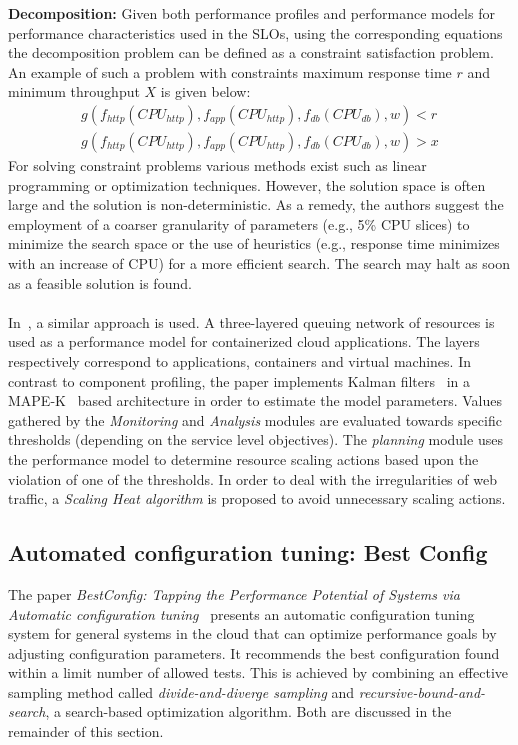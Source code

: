 \noindent\textbf{Decomposition:}
Given both performance profiles and performance models for performance characteristics used in the SLOs, using the corresponding equations the decomposition problem can be defined as a constraint satisfaction problem. An example of such a problem with constraints maximum response time $r$ and minimum throughput $X$ is given below:
\begin{align*}
g(f_{http}(CPU_{http}),f_{app}(CPU_{http}),f_{db}(CPU_{db}), w) < r \\ g(f_{http}(CPU_{http}),f_{app}(CPU_{http}),f_{db}(CPU_{db}), w ) > x 
\end{align*}
For solving constraint problems various methods exist such as linear programming or optimization techniques. However, the solution space is often large and the solution is non-deterministic. As a remedy, the authors suggest the employment of a coarser granularity of parameters (e.g., 5\% CPU slices) to minimize the search space or the use of heuristics (e.g., response time minimizes with an increase of CPU) for a more efficient search. The search may halt as soon as a feasible solution is found.~\cite{chen2007sla} \\\\
In~\cite{barna2017delivering}, a similar approach is used. A three-layered queuing network of resources is used as a performance model for containerized cloud applications. The layers respectively correspond to applications, containers and virtual machines. In contrast to component profiling, the paper implements Kalman filters~\cite{kalman1960new} in a MAPE-K~\cite{de2013software} based architecture in order to estimate the model parameters. Values gathered by the \textit{Monitoring} and \textit{Analysis} modules are evaluated towards specific thresholds (depending on the service level objectives). The \textit{planning} module uses the performance model to determine resource scaling actions based upon the violation of one of the thresholds. In order to deal with the irregularities of web traffic, a \textit{Scaling Heat algorithm} is proposed to avoid unnecessary scaling actions.


\subsection{Automated configuration tuning: Best Config}
\label{rw:bestconfig}
The paper \textit{BestConfig: Tapping the Performance Potential of Systems via Automatic configuration tuning}~\cite{zhu2017bestconfig}  presents an automatic configuration tuning system for general systems in the cloud that can optimize performance goals by adjusting configuration parameters. It recommends the best configuration found within a limit number of allowed tests. This is achieved by combining an effective sampling method called \textit{divide-and-diverge sampling} and \textit{recursive-bound-and-search}, a search-based optimization algorithm. Both are  discussed in the remainder of this section.
